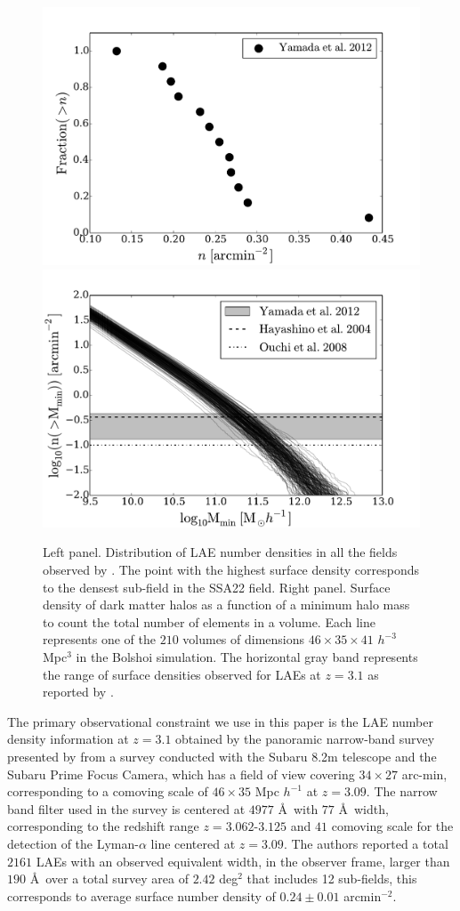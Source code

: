 \documentclass[usenatbib]{mn2e}
\newcommand{\hMpc}{{\ifmmode{h^{-1}{\rm Mpc}}\else{$h^{-1}$Mpc }\fi}}
\begin{document}
\begin{figure}
\begin{center}
\includegraphics[width=0.45\linewidth,angle=0]{Fig1b.pdf}
\includegraphics[width=0.45\linewidth,angle=0]{Fig1.pdf}
\caption{ \label{fig:halos} Left panel. Distribution of LAE number
  densities in all the fields observed by \citet{Yamada2012}. The
  point with the highest surface density corresponds to the densest
  sub-field in the SSA22 field. Right panel. Surface density of dark 
  matter halos as a function of a minimum halo mass to count the
  total number of elements in a volume. Each line represents one of the
  $210$ volumes of dimensions $46\times 35\times 41$ $h^{-3}$ Mpc$^{3}$
  in the Bolshoi simulation. The horizontal gray band represents the
  range of surface densities observed for LAEs at $z=3.1$ as reported
  by \citep{Yamada2012}.}
\end{center} 
\end{figure}

The primary observational constraint we use in this paper is the LAE number
density information at $z=3.1$ obtained by the panoramic narrow-band
survey presented by \cite{Yamada2012} from a survey
conducted with the Subaru 8.2m telescope and the Subaru Prime Focus Camera,
which has a field of view covering $34\times 27$ arc-min, corresponding to a
comoving scale of $46\times35$ Mpc $h^{-1}$ at $z=3.09$.  The narrow
band filter used in the survey is centered at $4977$ \AA~with  $77$ \AA~width,
corresponding to the redshift range $z=3.062$-$3.125$ and $41$ \hMpc comoving scale for the detection of the Lyman-$\alpha$ line
centered at $z=3.09$. The authors reported a total  $2161$  LAEs with
an observed equivalent width, in the observer frame, larger than $190$
\AA~over a total survey area of $2.42$ deg$^{2}$ that includes 12
sub-fields,  this corresponds to average surface number density of
$0.24\pm 0.01$ arcmin$^{-2}$. 
\end{document}
